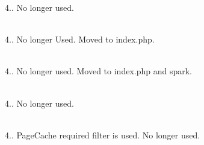 \begin{DoxyRefList}
%
4.. No longer used.  
\item[Member \doxylink{class_code_igniter_1_1_code_igniter_aa54d91141220554e1717b3cfd4e4e557}{Code\+Igniter\textbackslash{}Code\+Igniter\+::call\+Exit} (\$code)]\hfill \\
\label{deprecated__deprecated000033}%
%
4.. No longer Used. Moved to index.\+php. 
\item[Member \doxylink{class_code_igniter_1_1_code_igniter_a7339367ac9e3e31a99fbc61339a29df5}{Code\+Igniter\textbackslash{}Code\+Igniter\+::detect\+Environment} ()]\hfill \\
\label{deprecated__deprecated000023}%
%
4.. No longer used. Moved to index.\+php and spark.  
\item[Member \doxylink{class_code_igniter_1_1_code_igniter_a0f35a1d7ecd87be2805267e0c64f1615}{Code\+Igniter\textbackslash{}Code\+Igniter\+::determine\+Path} ()]\hfill \\
\label{deprecated__deprecated000031}%
%
4.. No longer used.  
\item[Member \doxylink{class_code_igniter_1_1_code_igniter_afbc02229faa119fec3175ca3e188e7ce}{Code\+Igniter\textbackslash{}Code\+Igniter\+::display\+Cache} (\doxylink{namespace_code_igniter_1_1_cache}{Cache} \$config)]\hfill \\
\label{deprecated__deprecated000026}%
%
4.. Page\+Cache required filter is used. No longer used. 




\end{DoxyRefList}
